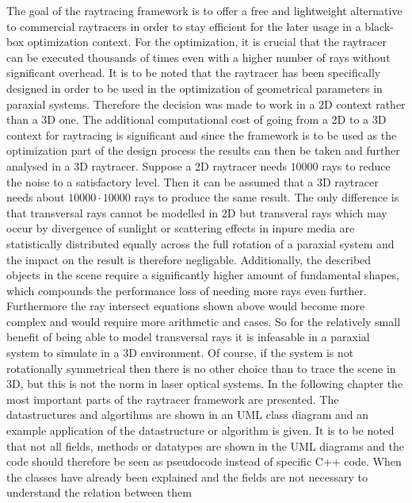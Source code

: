 \documentclass[a4paper,10pt]{article}
\begin{document}
    The goal of the raytracing framework is to offer a free and lightweight
    alternative to commercial raytracers in order to stay efficient
    for the later usage in a black-box optimization context.
    For the optimization, it is crucial that the raytracer can be executed thousands of times
    even with a higher number of rays without significant overhead.
    It is to be noted that the raytracer has been specifically designed in
    order to be used in the optimization of geometrical parameters in paraxial
    systems.
    Therefore the decision was made to work in a 2D context rather than a 3D
    one.
    The additional computational cost of going from a 2D to a 3D context for
    raytracing is significant and since the framework is to be used as
    the optimization part of the design process the results can then be
    taken and further analysed in a 3D raytracer.
    Suppose a 2D raytracer needs $10000$ rays to reduce the noise to a
    satisfactory level.
    Then it can be assumed that a 3D raytracer needs about $10000 \cdot
    10000$ rays to produce the same result.
    The only difference is that transversal rays cannot be modelled in
    2D but transveral rays which may occur by divergence of sunlight or
    scattering effects in inpure media are statistically distributed
    equally across the full rotation of a paraxial system and the impact
    on the result is therefore negligable.
    Additionally, the described objects in the scene require a significantly
    higher amount of fundamental shapes, which compounds the performance
    loss of needing more rays even further.
    Furthermore the ray intersect equations shown above would become more
    complex and would require more arithmetic and cases.
    So for the relatively small benefit of being able to model transversal
    rays it is infeasable in a paraxial system to simulate in a 3D environment.
    Of course, if the system is not rotationally symmetrical then there
    is no other choice than to trace the scene in 3D, but this is
    not the norm in laser optical systems.
    In the following chapter the most important parts of the raytracer
    framework are presented.
    The datastructures and algortihms are shown in an UML class diagram
    and an example application of the datastructure or algorithm is given. 
    It is to be noted that not all fields, methods or datatypes
    are shown in the UML diagrams and the code should therefore
    be seen as pseudocode instead of specific C++ code.
    When the classes have already been explained and the fields
    are not necessary to understand the relation between them
\end{document}
